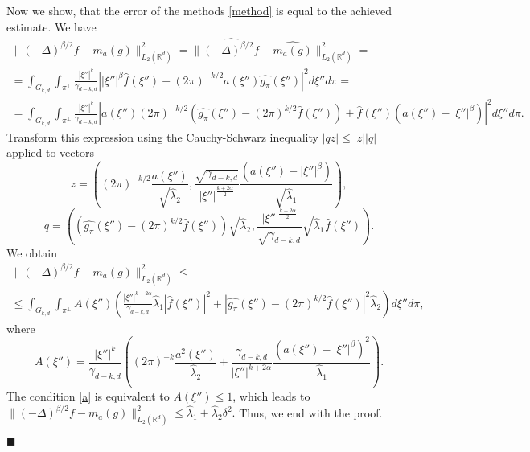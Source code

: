 \documentclass[12pt]{iopart}
\newenvironment{proof}
{\par\noindent{\bf Proof}}
{\hfill$\scriptstyle\blacksquare$}
\begin{document}
\begin{proof}
Now we show, that the error of the methods \eqref{method} is equal to the achieved estimate.
We have
\begin{multline*}
  \|(-\Delta)^{\beta/2}f-m_a(g)\|^2_{L_2(\mathbb R^d)}=\|\widehat{(-\Delta)^{\beta/2}f}-\widehat{m_a(g)}\|^2_{L_2(\mathbb R^d)}=\\
  =\int_{G_{k,d}}\int_{\pi^\perp}\frac{|\xi''|^k}{\gamma_{d-k,d}}\left||\xi''|^\beta \widehat f(\xi'')-(2\pi)^{-k/2}a(\xi'')\widehat{g_\pi}(\xi'')\right|^2d\xi'' d\pi =\\
  =\int_{G_{k,d}}\int_{\pi^\perp}\frac{|\xi''|^k}{\gamma_{d-k,d}}\left|a(\xi'')(2\pi)^{-k/2}\left(\widehat{g_\pi }(\xi'')-(2\pi)^{k/2}\widehat 
      f(\xi'' )\right)+\widehat
    f(\xi'')\left(a(\xi'')-|\xi''|^\beta\right)\right|^2d\xi'' d\pi .
\end{multline*}
Transform this expression using the Cauchy-Schwarz inequality $|qz|\leqslant |z||q|$ applied to vectors
\[
z=\left((2\pi)^{-k/2}\frac{a(\xi'')}{\sqrt{\widehat\lambda_2}},\frac{\sqrt{\gamma_{d-k,d}}}{|\xi''|^{\frac{k+2\alpha}{2}}}\frac{(a(\xi'')-|\xi''|^\beta)}{\sqrt{\widehat\lambda_1}}\right),
\]
\[
q=\left(\left(\widehat{g_\pi }(\xi'')-(2\pi)^{k/2}\widehat
    f(\xi'' )\right)\sqrt{\widehat\lambda_2},\frac{|\xi''|^{\frac{k+2\alpha}{2}}}{\sqrt{\gamma_{d-k,d}}}\sqrt{\widehat\lambda_1}\widehat
  f(\xi'' )\right).
\]
We obtain
\begin{multline*}  
  \|(-\Delta)^{\beta/2}f-m_a(g)\|^2_{L_2(\mathbb R^d)}\leqslant  \\
  \leqslant \int_{G_{k,d}}\int_{\pi^\perp}
  A(\xi'')\left(\frac{|\xi''|^{k+2\alpha}}{\gamma_{d-k,d}}\widehat\lambda_1|\widehat
    f(\xi'')|^2+\left|\widehat{g_\pi
      }(\xi'')-(2\pi)^{k/2}\widehat f(\xi''
      )\right|^2\widehat\lambda_2\right)d\xi'' d\pi ,
\end{multline*}
where
  \[
  A(\xi'')=\frac{|\xi''|^k}{\gamma_{d-k,d}}\left((2\pi)^{-k}\frac{a^2(\xi'')}{\widehat\lambda_2}+\frac{\gamma_{d-k,d}}{|\xi''|^{k+2\alpha}}\frac{(a(\xi'')-|\xi''|^\beta)^2}{\widehat\lambda_1}\right).
  \]
  The condition \eqref{a} is equivalent to $A(\xi'')\leqslant 1$, which leads to $ \|(-\Delta)^{\beta/2}f-m_a(g)\|^2_{L_2(\mathbb R^d)}\leqslant
  \widehat\lambda_1+\widehat\lambda_2\delta^2.$
Thus, we end with the proof.

\end{proof}
\end{document}
